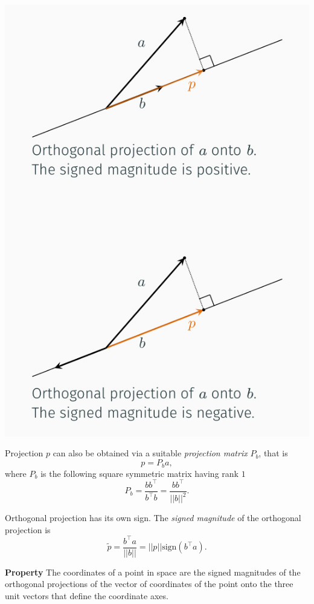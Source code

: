 \documentclass[10pt]{report}
\begin{document}
\begin{center}
\includegraphics[scale=0.3]{./pics/alg/orth-proj.jpg}
\end{center}

Projection \(p\) can also be obtained via a suitable \emph{projection matrix} \(P_b\), that is $$p = P_b a,$$ where \(P_b\) is the following square symmetric matrix having rank \(1\) $$P_b = \frac{bb^\top}{b^\top b} = \frac{bb^\top}{||b||^2}.$$

Orthogonal projection has its own sign. The \emph{signed magnitude} of the orthogonal projection is $$\tilde p = \frac{b^\top a}{||b||} =||p||\mbox{sign}(b^\top a).$$

\textbf{Property} The coordinates of a point in space are the signed magnitudes of the orthogonal projections of the vector of coordinates of the point onto the three unit vectors that define the coordinate axes.
\end{document}
